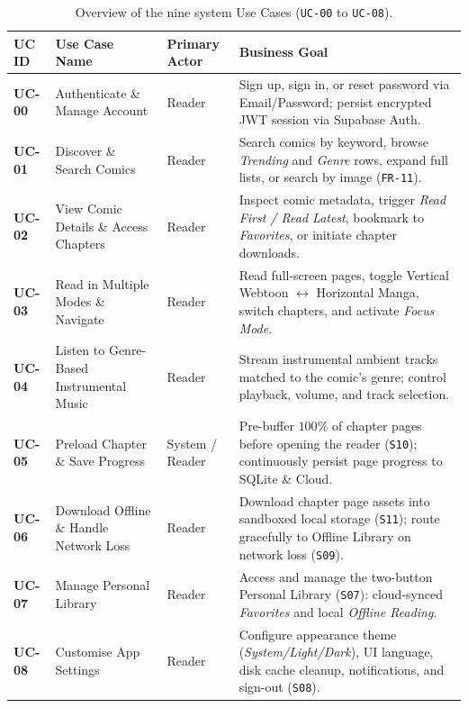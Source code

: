 \begin{table}[H]
\centering
\caption{Overview of the nine system Use Cases (\texttt{UC-00} to \texttt{UC-08}).}
\label{tab:uc_summary}
\footnotesize
\renewcommand{\arraystretch}{1.22}
\begin{tabularx}{\textwidth}{C{1.4cm} L{4.6cm} C{2.3cm} Y}
\toprule
{}
\textbf{UC ID} & \textbf{Use Case Name} & \textbf{Primary Actor} & \textbf{Business Goal} \\
\midrule
\textbf{UC-00} & Authenticate \& Manage Account & Reader & Sign up, sign in, or reset password via Email/Password; persist encrypted JWT session via Supabase Auth. \\
\textbf{UC-01} & Discover \& Search Comics & Reader & Search comics by keyword, browse \textit{Trending} and \textit{Genre} rows, expand full lists, or search by image (\texttt{FR-11}). \\
\textbf{UC-02} & View Comic Details \& Access Chapters & Reader & Inspect comic metadata, trigger \textit{Read First / Read Latest}, bookmark to \textit{Favorites}, or initiate chapter downloads. \\
\textbf{UC-03} & Read in Multiple Modes \& Navigate & Reader & Read full-screen pages, toggle Vertical Webtoon $\leftrightarrow$ Horizontal Manga, switch chapters, and activate \textit{Focus Mode}. \\
\textbf{UC-04} & Listen to Genre-Based Instrumental Music & Reader & Stream instrumental ambient tracks matched to the comic's genre; control playback, volume, and track selection. \\
\textbf{UC-05} & Preload Chapter \& Save Progress & System / Reader & Pre-buffer $100\%$ of chapter pages before opening the reader (\texttt{S10}); continuously persist page progress to SQLite \& Cloud. \\
\textbf{UC-06} & Download Offline \& Handle Network Loss & Reader & Download chapter page assets into sandboxed local storage (\texttt{S11}); route gracefully to Offline Library on network loss (\texttt{S09}). \\
\textbf{UC-07} & Manage Personal Library & Reader & Access and manage the two-button Personal Library (\texttt{S07}): cloud-synced \textit{Favorites} and local \textit{Offline Reading}. \\
\textbf{UC-08} & Customise App Settings & Reader & Configure appearance theme (\textit{System/Light/Dark}), UI language, disk cache cleanup, notifications, and sign-out (\texttt{S08}). \\
\bottomrule
\end{tabularx}
\end{table}

